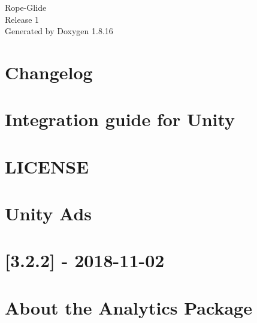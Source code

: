 \let\mypdfximage\pdfximage\def\pdfximage{\immediate\mypdfximage}\documentclass[twoside]{book}
\newcommand{\+}{\discretionary{\mbox{\scriptsize$\hookleftarrow$}}{}{}}
\newcommand{\clearemptydoublepage}{%
  \newpage{\pagestyle{empty}\cleardoublepage}%
}
\begin{document}
\hypersetup{pageanchor=false,
             bookmarksnumbered=true,
             pdfencoding=unicode
            }
\begin{titlepage}
\vspace*{7cm}
\begin{center}%
{\Large Rope-\/\+Glide \\[1ex]\large Release 1 }\\
\vspace*{1cm}
{\large Generated by Doxygen 1.8.16}\\
\end{center}
\end{titlepage}
\clearemptydoublepage
{}
\tableofcontents
\clearemptydoublepage
{}
\hypersetup{pageanchor=true}

\chapter{Changelog}
\label{autotoc_md0}

\chapter{Integration guide for Unity}
\label{autotoc_md9}

\chapter{L\+I\+C\+E\+N\+SE}
\label{md_Library_PackageCache_com_8unity_8ads_0d2_83_81_LICENSE}

\chapter{Unity Ads}
\label{autotoc_md10}

\chapter{\mbox{[}3.2.2\mbox{]} -\/ 2018-\/11-\/02}
\label{autotoc_md11}

\chapter{About the Analytics Package}
\label{autotoc_md23}

\end{document}

